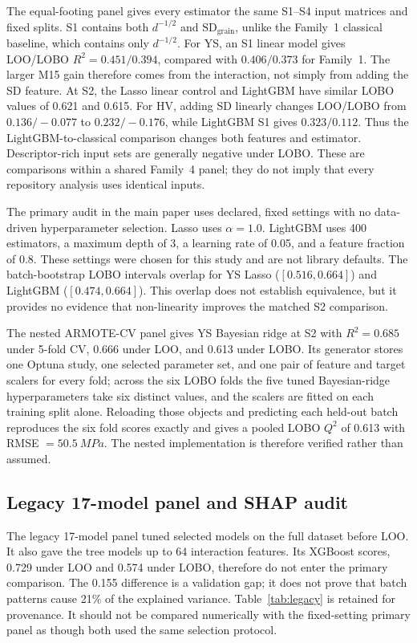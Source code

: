 \documentclass[a4paper,11pt]{article}
\begin{document}
The equal-footing panel gives every estimator the same S1--S4 input matrices and fixed splits. S1 contains both $d^{-1/2}$ and $\mathrm{SD}_{\mathrm{grain}}$, unlike the Family~1 classical baseline, which contains only $d^{-1/2}$. For YS, an S1 linear model gives LOO/LOBO $R^2=0.451/0.394$, compared with $0.406/0.373$ for Family~1. The larger M15 gain therefore comes from the interaction, not simply from adding the SD feature. At S2, the Lasso linear control and LightGBM have similar LOBO values of 0.621 and 0.615. For HV, adding SD linearly changes LOO/LOBO from $0.136/-0.077$ to $0.232/-0.176$, while LightGBM S1 gives $0.323/0.112$. Thus the LightGBM-to-classical comparison changes both features and estimator. Descriptor-rich input sets are generally negative under LOBO. These are comparisons within a shared Family~4 panel; they do not imply that every repository analysis uses identical inputs.

The primary audit in the main paper uses declared, fixed settings with no data-driven hyperparameter selection. Lasso uses $\alpha=1.0$. LightGBM uses 400 estimators, a maximum depth of 3, a learning rate of 0.05, and a feature fraction of 0.8. These settings were chosen for this study and are not library defaults. The batch-bootstrap LOBO intervals overlap for YS Lasso ($[0.516,0.664]$) and LightGBM ($[0.474,0.664]$). This overlap does not establish equivalence, but it provides no evidence that non-linearity improves the matched S2 comparison.

The nested ARMOTE-CV panel gives YS Bayesian ridge at S2 with $R^2=0.685$ under 5-fold CV, 0.666 under LOO, and 0.613 under LOBO. Its generator stores one Optuna study, one selected parameter set, and one pair of feature and target scalers for every fold; across the six LOBO folds the five tuned Bayesian-ridge hyperparameters take six distinct values, and the scalers are fitted on each training split alone. Reloading those objects and predicting each held-out batch reproduces the six fold scores exactly and gives a pooled LOBO $Q^2$ of 0.613 with RMSE $=\SI{50.5}{MPa}$. The nested implementation is therefore verified rather than assumed.

\subsection{Legacy 17-model panel and SHAP audit}

The legacy 17-model panel tuned selected models on the full dataset before LOO. It also gave the tree models up to 64 interaction features. Its XGBoost scores, 0.729 under LOO and 0.574 under LOBO, therefore do not enter the primary comparison. The 0.155 difference is a validation gap; it does not prove that batch patterns cause 21\% of the explained variance. Table~\ref{tab:legacy} is retained for provenance. It should not be compared numerically with the fixed-setting primary panel as though both used the same selection protocol.
\end{document}
